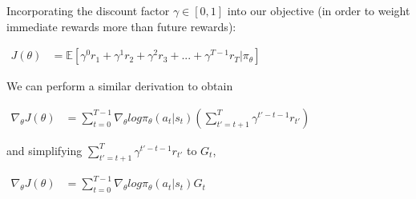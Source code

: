 \documentclass[letterpaper,11pt]{article}
\begin{document}
Incorporating the discount factor $\gamma \in [0,1]$ into our objective (in order to weight immediate rewards more than future rewards):

\begin{center}
$\begin{aligned}
    J(\theta) &= \mathbb{E}[\gamma^{0} r_{1} + \gamma^{1} r_{2} + \gamma^{2} r_{3} + ... + \gamma^{T-1} r_{T} | \pi_{\theta}]
\end{aligned}$
\end{center}

We can perform a similar derivation to obtain

\begin{center}
$\begin{aligned}
    \nabla_{\theta} J(\theta) &= \sum_{t=0}^{T-1} \nabla_{\theta} log \pi_{\theta} (a_{t} | s_{t}) (\sum_{t'=t+1}^{T} \gamma^{t' - t - 1} r_{t'})
\end{aligned}$
\end{center}

and simplifying $\sum_{t'=t+1}^{T} \gamma^{t' - t - 1} r_{t'}$ to $G_{t}$,

\begin{center}
$\begin{aligned}
    \nabla_{\theta} J(\theta) &= \sum_{t=0}^{T-1} \nabla_{\theta} log \pi_{\theta} (a_{t} | s_{t}) G_{t}
\end{aligned}$
\end{center}
\end{document}
